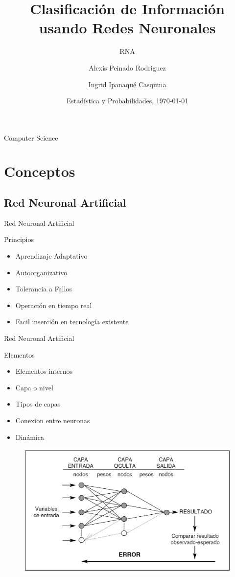 \documentclass{beamer}
\title{Clasificación de Información usando Redes Neuronales}
\subtitle{RNA}
\author{Alexis Peinado Rodriguez \and Ingrid Ipanaqué Casquina}
\institute[Universidad Nacional De Ingenieria]
{
  Ciencia de la Computación\\
  Universidad Nacional de Ingeniería
}
\date{Estadística y Probabilidades, \today}
\begin{document}
\begin{frame}
  \titlepage
\end{frame}

\begin{frame}{Computer Science}
  \tableofcontents
\end{frame}

\section{Conceptos}

\subsection{Red Neuronal Artificial}

\begin{frame}{Red Neuronal Artificial}
\begin{block}{Principios}\pause
\begin{itemize}
\item {Aprendizaje Adaptativo\pause}
\item {Autoorganizativo\pause}
\item {Tolerancia a Fallos\pause}
\item {Operación en tiempo real\pause}
\item {Facil inserción en tecnología existente}
\end{itemize}
\end{block}
\end{frame}

\begin{frame}{Red Neuronal Artificial}
\begin{block}{Elementos}\pause
\begin{itemize}
\item {Elementos internos\pause}
\item {Capa o nivel\pause}
\item {Tipos de capas\pause}
\item {Conexion entre neuronas\pause}
\item {Dinámica}
\end{itemize}
\begin{figure}
\includegraphics[scale=0.15]{elementos1.png}
\centering
\end{figure}
\end{block}
\end{frame}
\end{document}
